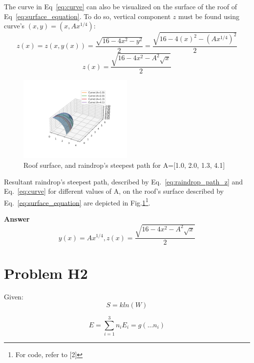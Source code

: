 \documentclass{article}
\begin{document}
The curve in Eq~\eqref{eq:curve} can also be visualized on the surface of the roof of Eq~\eqref{eq:surface_equation}. To do so, vertical component $z$ must be found using curve's $(x, y) = (x, Ax^{1/4})$:
\begin{equation*}
  z(x) = z(x, y(x)) = \frac{\sqrt{16 - 4x^2 - y^2}}{2} = \frac{\sqrt{16 - 4(x)^2 - (Ax^{1/4})^2}}{2}
\end{equation*}
\begin{equation} \label{eq:raindrop_path_z}
  z(x) = \frac{\sqrt{16 - 4x^2 - A^2\sqrt{x}}}{2}
\end{equation}

\begin{figure}[H]
  \centering
  \includegraphics[width=0.5\textwidth]{calculus/W3/img/surface.png}
  \caption{Roof surface, and raindrop's steepest path for A=[1.0, 2.0, 1.3, 4.1]}
  \label{fig:surface}  
\end{figure}

Resultant raindrop's steepest path, described by Eq.~\eqref{eq:raindrop_path_z} and Eq.~\eqref{eq:curve} for different values of A, on the roof's surface described by Eq.~\eqref{eq:surface_equation} are depicted in Fig.\ref{fig:surface}\footnote{For code, refer to [2]}.

\hfill \break
\textbf{Answer}
\begin{equation*}
  y(x) = Ax^{1/4}, z(x) = \frac{\sqrt{16 - 4x^2 - A^2\sqrt{x}}}{2}
\end{equation*}

\section{ Problem H2 }

Given:
\begin{equation} \label{eq:stirling_of_W}
  S = kln(W)
\end{equation}

\begin{equation} \label{eq:energy_conservation}
  E = \sum_{i=1}^{3}{n_iE_i} = g(...n_i) 
\end{equation}
\end{document}
